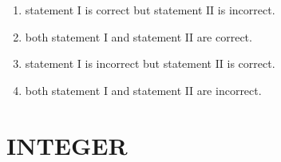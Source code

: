 \documentclass[journal]{IEEEtran}
\numberwithin{equation}{enumi}
\numberwithin{figure}{enumi}
\begin{document}
\begin{enumerate}
    \hfill{}

    \begin{enumerate}
        \item statement $\mathrm{I}$ is correct but statement $\mathrm{II}$ is incorrect. 
        \item both statement $\mathrm{I}$ and statement $\mathrm{II}$ are correct.
        \item statement $\mathrm{I}$ is incorrect but statement $\mathrm{II}$ is correct. 
        \item both statement $\mathrm{I}$ and statement $\mathrm{II}$ are incorrect.  
    \end{enumerate}
\end{enumerate}

\section{INTEGER}
\end{document}

